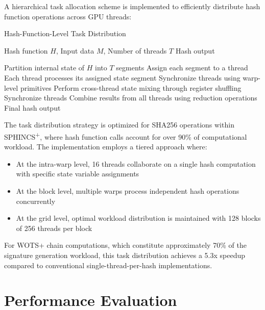 \documentclass[journal]{IEEEtran}
\begin{document}
A hierarchical task allocation scheme is implemented to efficiently distribute hash function operations across GPU threads:

\begin{algorithm}
  \caption{Hash-Function-Level Task Distribution}
  \begin{algorithmic}[1]
    \REQUIRE Hash function $H$, Input data $M$, Number of threads $T$
    \ENSURE Hash output

    \STATE Partition internal state of $H$ into $T$ segments
    \STATE Assign each segment to a thread
    \STATE Each thread processes its assigned state segment
    \STATE Synchronize threads using warp-level primitives
    \STATE Perform cross-thread state mixing through register shuffling
    \STATE Synchronize threads
    \ENDFOR
    \STATE Combine results from all threads using reduction operations
    \RETURN Final hash output
  \end{algorithmic}
\end{algorithm}

The task distribution strategy is optimized for SHA256 operations within SPHINCS\textsuperscript{+}, where hash function calls account for over 90\% of computational workload. The implementation employs a tiered approach where:

\begin{itemize}
  \item At the intra-warp level, 16 threads collaborate on a single hash computation with specific state variable assignments
  \item At the block level, multiple warps process independent hash operations concurrently
  \item At the grid level, optimal workload distribution is maintained with 128 blocks of 256 threads per block
\end{itemize}

For WOTS+ chain computations, which constitute approximately 70\% of the signature generation workload, this task distribution achieves a 5.3x speedup compared to conventional single-thread-per-hash implementations.

\section{Performance Evaluation}\label{sec:evaluation}

\end{document}
